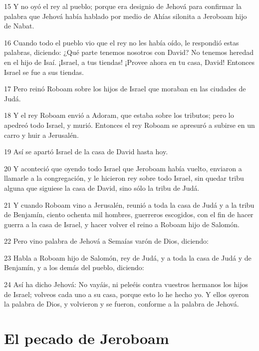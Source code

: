 \par 15 Y no oyó el rey al pueblo; porque era designio de Jehová para confirmar la palabra que Jehová había hablado por medio de Ahías silonita a Jeroboam hijo de Nabat.
\par 16 Cuando todo el pueblo vio que el rey no les había oído, le respondió estas palabras, diciendo: ¿Qué parte tenemos nosotros con David? No tenemos heredad en el hijo de Isaí. ¡Israel, a tus tiendas! ¡Provee ahora en tu casa, David! Entonces Israel se fue a sus tiendas.
\par 17 Pero reinó Roboam sobre los hijos de Israel que moraban en las ciudades de Judá.
\par 18 Y el rey Roboam envió a Adoram, que estaba sobre los tributos; pero lo apedreó todo Israel, y murió. Entonces el rey Roboam se apresuró a subirse en un carro y huir a Jerusalén.
\par 19 Así se apartó Israel de la casa de David hasta hoy.
\par 20 Y aconteció que oyendo todo Israel que Jeroboam había vuelto, enviaron a llamarle a la congregación, y le hicieron rey sobre todo Israel, sin quedar tribu alguna que siguiese la casa de David, sino sólo la tribu de Judá.
\par 21 Y cuando Roboam vino a Jerusalén, reunió a toda la casa de Judá y a la tribu de Benjamín, ciento ochenta mil hombres, guerreros escogidos, con el fin de hacer guerra a la casa de Israel, y hacer volver el reino a Roboam hijo de Salomón.
\par 22 Pero vino palabra de Jehová a Semaías varón de Dios, diciendo:
\par 23 Habla a Roboam hijo de Salomón, rey de Judá, y a toda la casa de Judá y de Benjamín, y a los demás del pueblo, diciendo:
\par 24 Así ha dicho Jehová: No vayáis, ni peleéis contra vuestros hermanos los hijos de Israel; volveos cada uno a su casa, porque esto lo he hecho yo. Y ellos oyeron la palabra de Dios, y volvieron y se fueron, conforme a la palabra de Jehová.

\section*{El pecado de Jeroboam}

